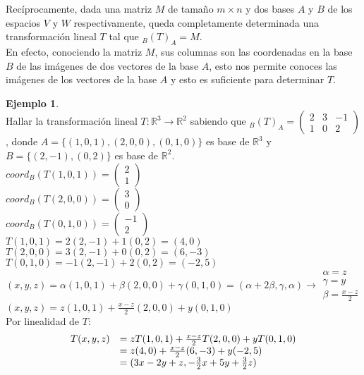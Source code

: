 \documentclass[10pt]{article}
\theoremstyle{definition}
\newtheorem{example}{Ejemplo}[section]
\begin{document}
Recíprocamente, dada una matriz $M$ de tamaño $m\times n$ y dos bases $A$ y $B$ de los espacios $V$ y $W$ respectivamente, queda completamente determinada una transformación lineal $T$ tal que $_B(T)_A=M$.\\
En efecto, conociendo la matriz $M$, sus columnas son las coordenadas en la base $B$ de las imágenes de dos vectores de la base $A$, esto nos permite conoces las imágenes de los vectores de la base $A$ y esto es suficiente para determinar $T$.
\begin{example}{ \ }
	\\Hallar la transformación lineal $T:\mathbb{R}^3\rightarrow\mathbb{R}^2$ sabiendo que $_B(T)_A=\begin{pmatrix}2&3&-1\\1&0&2\end{pmatrix}$, donde $A=\{(1,0,1),(2,0,0),(0,1,0)\}$ es base de $\mathbb{R}^3$ y $B=\{(2,-1),(0,2)\}$ es base de $\mathbb{R}^2$.\\
	$coord_B(T(1,0,1))=\begin{pmatrix}2\\1\end{pmatrix}$\\
	$coord_B(T(2,0,0))=\begin{pmatrix}3\\0\end{pmatrix}$\\
	$coord_B(T(0,1,0))=\begin{pmatrix}-1\\2\end{pmatrix}$\\
	$T(1,0,1)=2(2,-1)+1(0,2)=(4,0)$\\
	$T(2,0,0)=3(2,-1)+0(0,2)=(6,-3)$\\
	$T(0,1,0)=-1(2,-1)+2(0,2)=(-2,5)$\\
	$(x,y,z)=\alpha(1,0,1)+\beta(2,0,0)+\gamma(0,1,0)=(\alpha+2\beta,\gamma,\alpha)\rightarrow\begin{matrix}\alpha=z\\\gamma=y\\\beta=\frac{x-z}{2}\end{matrix}$\\
	$(x,y,z)=z(1,0,1)+\frac{x-z}{2}(2,0,0)+y(0,1,0)$\\
	Por linealidad de $T$:\\
	$$\begin{array}{ c l }
			T(x,y,z) & =z T(1,0,1)+\frac{x-z}{2}  T(2,0,0)+y T(0,1,0) \\
			         & =z(4,0)+\frac{x-z}{2} (6,-3)+y(-2,5)           \\
			         & =(3x-2y+z,-\frac{3}{2} x+5y+\frac{3}{2} z)
		\end{array}$$
\end{example}
\end{document}
